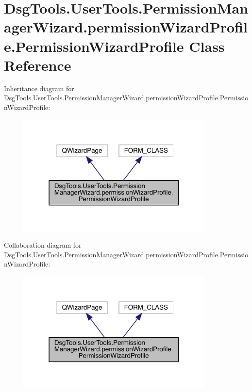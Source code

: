 \hypertarget{class_dsg_tools_1_1_user_tools_1_1_permission_manager_wizard_1_1permission_wizard_profile_1_1_permission_wizard_profile}{}\section{Dsg\+Tools.\+User\+Tools.\+Permission\+Manager\+Wizard.\+permission\+Wizard\+Profile.\+Permission\+Wizard\+Profile Class Reference}
\label{class_dsg_tools_1_1_user_tools_1_1_permission_manager_wizard_1_1permission_wizard_profile_1_1_permission_wizard_profile}


Inheritance diagram for Dsg\+Tools.\+User\+Tools.\+Permission\+Manager\+Wizard.\+permission\+Wizard\+Profile.\+Permission\+Wizard\+Profile\+:
\nopagebreak
\begin{figure}[H]
\begin{center}
\leavevmode
\includegraphics[width=280pt]{class_dsg_tools_1_1_user_tools_1_1_permission_manager_wizard_1_1permission_wizard_profile_1_1_pe71e9de001d7be1dcbb4648ace6a8d558}
\end{center}
\end{figure}


Collaboration diagram for Dsg\+Tools.\+User\+Tools.\+Permission\+Manager\+Wizard.\+permission\+Wizard\+Profile.\+Permission\+Wizard\+Profile\+:
\nopagebreak
\begin{figure}[H]
\begin{center}
\leavevmode
\includegraphics[width=280pt]{class_dsg_tools_1_1_user_tools_1_1_permission_manager_wizard_1_1permission_wizard_profile_1_1_pe0eafa954550a9710accba6954fdff9e1}
\end{center}
\end{figure}
